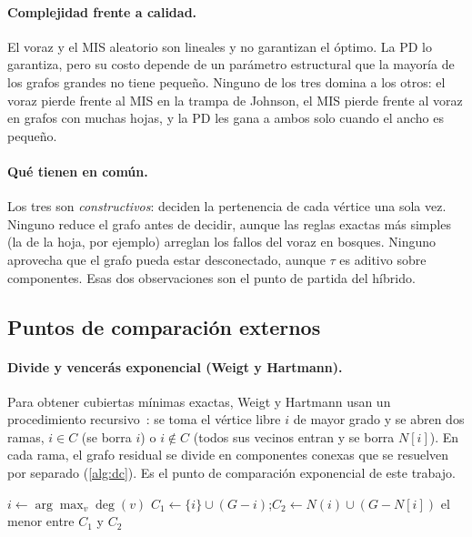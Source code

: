 \paragraph{Complejidad frente a calidad.} El voraz y el MIS aleatorio son lineales y no garantizan el óptimo. La PD lo garantiza, pero su costo depende de un parámetro estructural que la mayoría de los grafos grandes no tiene pequeño. Ninguno de los tres domina a los otros: el voraz pierde frente al MIS en la trampa de Johnson, el MIS pierde frente al voraz en grafos con muchas hojas, y la PD les gana a ambos solo cuando el ancho es pequeño.

\paragraph{Qué tienen en común.} Los tres son \emph{constructivos}: deciden la pertenencia de cada vértice una sola vez. Ninguno reduce el grafo antes de decidir, aunque las reglas exactas más simples (la de la hoja, por ejemplo) arreglan los fallos del voraz en bosques. Ninguno aprovecha que el grafo pueda estar desconectado, aunque $\tau$ es aditivo sobre componentes. Esas dos observaciones son el punto de partida del híbrido.

\subsection{Puntos de comparación externos}\label{sec:sota}
\paragraph{Divide y vencerás exponencial (Weigt y Hartmann).} Para obtener cubiertas mínimas exactas, Weigt y Hartmann usan un procedimiento recursivo~\citep{weigt2001}: se toma el vértice libre $i$ de mayor grado y se abren dos ramas, $i\in C$ (se borra $i$) o $i\notin C$ (todos sus vecinos entran y se borra $N[i]$). En cada rama, el grafo residual se divide en componentes conexas que se resuelven por separado (\cref{alg:dc}). Es el punto de comparación exponencial de este trabajo.

\begin{algorithm}[!htbp]
\caption{$(G)$: divide y vencerás exacto de Weigt y Hartmann}\label{alg:dc}
$i\gets\arg\max_v\deg(v)$\;
$C_1\gets\{i\}\cup$$(G-i)$;\quad $C_2\gets N(i)\cup$$(G-N[i])$\;
\Return el menor entre $C_1$ y $C_2$\;
\end{algorithm}

